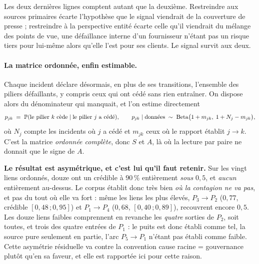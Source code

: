 \vspace{2pt}
Les deux dernières lignes comptent autant que la deuxième. Restreindre aux sources
primaires écarte l'hypothèse que le signal viendrait de la couverture de presse ; restreindre à
la perspective entité écarte celle qu'il viendrait du mélange des points de vue, une
défaillance interne d'un fournisseur n'étant pas un risque tiers pour lui-même alors qu'elle
l'est pour ses clients. Le signal survit aux deux.

\paragraph{La matrice ordonnée, enfin estimable.} Chaque incident déclare désormais, en plus de
ses transitions, l'ensemble des piliers défaillants, y compris ceux qui ont cédé sans
rien entraîner. On dispose alors du dénominateur qui manquait, et l'on estime directement
\begin{equation}
  p_{jk} \;=\; \mathbb{P}(\text{le pilier } k \text{ cède} \mid \text{le pilier } j \text{ a cédé}),
  \qquad
  p_{jk}\mid\text{données} \;\sim\; \mathrm{Beta}\bigl(1+m_{jk},\;1+N_j-m_{jk}\bigr),
  \label{eq:pjk}
\end{equation}
où $N_j$ compte les incidents où $j$ a cédé et $m_{jk}$ ceux où le rapport établit $j\to k$.
C'est la matrice \emph{ordonnée complète}, donc $S$ et $A$, là où la lecture par paire
ne donnait que le signe de $A$.

\begin{attention}
\textbf{Le résultat est asymétrique, et c'est lui qu'il faut retenir.} Sur les vingt liens
ordonnés, douze ont un crédible à $90\,\%$ entièrement \emph{sous} $0{,}5$, et
\emph{aucun} entièrement au-dessus. Le corpus établit donc très bien \emph{où la contagion ne
va pas}, et pas du tout où elle va fort : même les liens les plus élevés, $P_3\to P_2$
($0{,}77$, crédible $[0{,}48\,;0{,}95]$) et $P_1\to P_4$ ($0{,}68$, $[0{,}40\,;0{,}89]$),
recouvrent encore $0{,}5$. Les douze liens faibles comprennent en revanche les
\emph{quatre} sorties de $P_2$, soit toutes, et trois des quatre entrées de $P_1$ : le puits est
donc établi comme tel, la source pure seulement en partie, l'arc $P_5 \to P_1$ n'étant pas établi
comme faible. Cette asymétrie résiduelle va contre la convention \og{}cause racine =
gouvernance\fg{} plutôt qu'en sa faveur, et elle est rapportée ici pour cette raison.
\end{attention}

